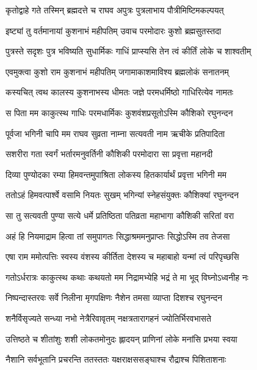 
\twolineshloka
{कृतोद्वाहे गते तस्मिन् ब्रह्मदत्ते च राघव}
{अपुत्रः पुत्रलाभाय पौत्रीमिष्टिमकल्पयत्} %

\twolineshloka
{इष्ट्यां तु वर्तमानायां कुशनाभं महीपतिम्}
{उवाच परमोदारः कुशो ब्रह्मसुतस्तदा} %

\twolineshloka
{पुत्रस्ते सदृशः पुत्र भविष्यति सुधार्मिकः}
{गाधिं प्राप्स्यसि तेन त्वं कीर्तिं लोके च शाश्वतीम्} %

\twolineshloka
{एवमुक्त्वा कुशो राम कुशनाभं महीपतिम्}
{जगामाकाशमाविश्य ब्रह्मलोकं सनातनम्} %

\twolineshloka
{कस्यचित् त्वथ कालस्य कुशनाभस्य धीमतः}
{जज्ञे परमधर्मिष्ठो गाधिरित्येव नामतः} %

\twolineshloka
{स पिता मम काकुत्स्थ गाधिः परमधार्मिकः}
{कुशवंशप्रसूतोऽस्मि कौशिको रघुनन्दन} %

\twolineshloka
{पूर्वजा भगिनी चापि मम राघव सुव्रता}
{नाम्ना सत्यवती नाम ऋचीके प्रतिपादिता} %

\twolineshloka
{सशरीरा गता स्वर्गं भर्तारमनुवर्तिनी}
{कौशिकी परमोदारा सा प्रवृत्ता महानदी} %

\twolineshloka
{दिव्या पुण्योदका रम्या हिमवन्तमुपाश्रिता}
{लोकस्य हितकार्यार्थं प्रवृत्ता भगिनी मम} %

\twolineshloka
{ततोऽहं हिमवत्पार्श्वे वसामि नियतः सुखम्}
{भगिन्यां स्नेहसंयुक्तः कौशिक्यां रघुनन्दन} %

\twolineshloka
{सा तु सत्यवती पुण्या सत्ये धर्मे प्रतिष्ठिता}
{पतिव्रता महाभागा कौशिकी सरितां वरा} %

\twolineshloka
{अहं हि नियमाद्राम हित्वा तां समुपागतः}
{सिद्धाश्रममनुप्राप्तः सिद्धोऽस्मि तव तेजसा} %

\twolineshloka
{एषा राम ममोत्पत्तिः स्वस्य वंशस्य कीर्तिता}
{देशस्य च महाबाहो यन्मां त्वं परिपृच्छसि} %

\twolineshloka
{गतोऽर्धरात्रः काकुत्स्थ कथाः कथयतो मम}
{निद्रामभ्येहि भद्रं ते मा भूद् विघ्नोऽध्वनीह नः} %

\twolineshloka
{निष्पन्दास्तरवः सर्वे निलीना मृगपक्षिणः}
{नैशेन तमसा व्याप्ता दिशश्च रघुनन्दन} %

\twolineshloka
{शनैर्विसृज्यते सन्ध्या नभो नेत्रैरिवावृतम्}
{नक्षत्रतारागहनं ज्योतिर्भिरवभासते} %

\twolineshloka
{उत्तिष्ठते च शीतांशुः शशी लोकतमोनुदः}
{ह्लादयन् प्राणिनां लोके मनांसि प्रभया स्वया} %

\twolineshloka
{नैशानि सर्वभूतानि प्रचरन्ति ततस्ततः}
{यक्षराक्षससङ्घाश्च रौद्राश्च पिशिताशनाः} %

